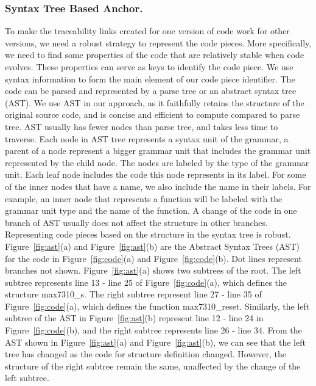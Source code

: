 \subsubsection{Syntax Tree Based Anchor.}
To make the traceability links created for one version of code work for other versions,
we need a robust strategy to represent the code pieces.
More specifically, we need to find some properties of the code that are relatively stable when code evolves.
These properties can serve as keys to identify the code piece.
We use syntax information to form the main element of our code piece identifier.
The code can be parsed and represented by a parse tree or an abstract syntax tree (AST).
We use AST in our approach, as it faithfully retains the structure of the original source code, and is concise and efficient to compute compared to parse tree.
AST usually has fewer nodes than parse tree, and takes less time to traverse.
Each node in AST tree represents a syntax unit of the grammar,
a parent of a node represent a bigger grammar unit that includes the grammar unit represented by the child node.
The nodes are labeled by the type of the grammar unit.
Each leaf node includes the code this node represents in its label.
For some of the inner nodes that have a name, we also include the name in their labels. For example, an inner node that represents a function will be labeled with the grammar unit type and the name of the function.
A change of the code in one branch of AST usually does not affect the structure in other branches.
Representing code pieces based on the structure in the syntax tree is robust.
Figure~\ref{fig:ast}(a) and Figure~\ref{fig:ast}(b) are the Abstract Syntax Trees (AST) for the code in Figure~\ref{fig:code}(a) and Figure~\ref{fig:code}(b).
Dot lines represent branches not shown.
Figure~\ref{fig:ast}(a) shows two subtrees of the root.
The left subtree represents line 13 - line 25 of Figure~\ref{fig:code}(a), which defines the structure max7310\_s.
The right subtree represent line 27 - line 35 of Figure~\ref{fig:code}(a), which defines the function max7310\_reset.
Similarly, the left subtree of the AST in Figure~\ref{fig:ast}(b) represent line 12 - line 24 in Figure~\ref{fig:code}(b), and the right subtree represents line 26 - line 34.
From the AST shown in Figure~\ref{fig:ast}(a) and Figure~\ref{fig:ast}(b), we can see that the left tree has changed as the code for structure definition changed.
However, the structure of the right subtree remain the same, unaffected by the change of the left subtree.

